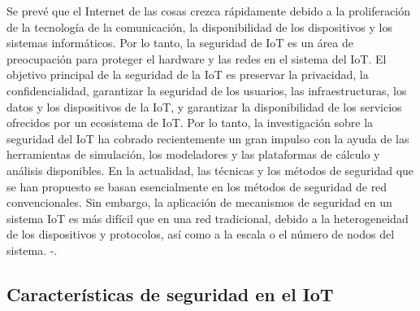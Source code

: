 {Se prevé que el Internet de las cosas crezca rápidamente debido a la proliferación de la tecnología de la comunicación, la disponibilidad de los dispositivos y los sistemas informáticos. Por lo tanto, la seguridad de IoT es un área de preocupación para proteger el hardware y las redes en el sistema del IoT. El objetivo principal de la seguridad de la IoT es preservar la privacidad, la confidencialidad, garantizar la seguridad de los usuarios, las infraestructuras, los datos y los dispositivos de la IoT, y garantizar la disponibilidad de los servicios ofrecidos por un ecosistema de IoT. Por lo tanto, la investigación sobre la seguridad del IoT ha cobrado recientemente un gran impulso con la ayuda de las herramientas de simulación, los modeladores y las plataformas de cálculo y análisis disponibles. En la actualidad, las técnicas y los métodos de seguridad que se han propuesto se basan esencialmente en los métodos de seguridad de red convencionales. Sin embargo, la aplicación de mecanismos de seguridad en un sistema IoT es más difícil que en una red tradicional, debido a la heterogeneidad de los dispositivos y protocolos, así como a la escala o el número de nodos del sistema. \cite{lin2017survey}-\cite{hassan2019current}.

\subsection{Características de seguridad en el IoT}

}
